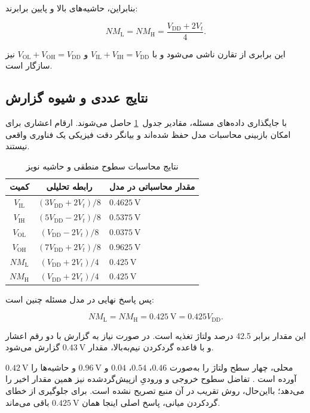 بنابراین، حاشیه‌های بالا و پایین برابرند:

\nopagebreak[3]
\begin{equation}\label{eq:ex17-11}
\boxed{
NM_{\mathrm{L}}=NM_{\mathrm{H}}
=\frac{V_{\mathrm{DD}}+2V_t}{4}
}.
\end{equation}

این برابری از تقارن  ناشی می‌شود و با \(V_{\mathrm{IL}}+V_{\mathrm{IH}}=V_{\mathrm{DD}}\) و \(V_{\mathrm{OL}}+V_{\mathrm{OH}}=V_{\mathrm{DD}}\) نیز سازگار است.

\clearpage
\subsection*{نتایج عددی و شیوه گزارش}

با جایگذاری داده‌های مسئله، مقادیر جدول~\ref{tab:noise} حاصل می‌شوند. ارقام اعشاری برای امکان بازبینی محاسبات مدل حفظ شده‌اند و بیانگر دقت فیزیکی یک فناوری واقعی نیستند.

\begin{table}[htbp]\centering
\caption{نتایج محاسبات سطوح منطقی و حاشیه نویز}
\label{tab:noise}
\begin{tabularx}{\linewidth}{ccX}\toprule
کمیت & رابطه تحلیلی & مقدار محاسباتی در مدل\\
\midrule
\(V_{\mathrm{IL}}\) & \((3V_{\mathrm{DD}}+2V_t)/8\) & \(\qty{0.4625}{\volt}\)\\
\(V_{\mathrm{IH}}\) & \((5V_{\mathrm{DD}}-2V_t)/8\) & \(\qty{0.5375}{\volt}\)\\
\(V_{\mathrm{OL}}\) & \((V_{\mathrm{DD}}-2V_t)/8\) & \(\qty{0.0375}{\volt}\)\\
\(V_{\mathrm{OH}}\) & \((7V_{\mathrm{DD}}+2V_t)/8\) & \(\qty{0.9625}{\volt}\)\\
\(NM_{\mathrm{L}}\) & \((V_{\mathrm{DD}}+2V_t)/4\) & \(\qty{0.425}{\volt}\)\\
\(NM_{\mathrm{H}}\) & \((V_{\mathrm{DD}}+2V_t)/4\) & \(\qty{0.425}{\volt}\)\\
\bottomrule\end{tabularx}\end{table}

پس پاسخ نهایی در مدل مسئله چنین است:

\nopagebreak[3]
\begin{equation}\label{eq:ex17-12}
\boxed{NM_{\mathrm{L}}=NM_{\mathrm{H}}=\qty{0.425}{\volt}
=0.425V_{\mathrm{DD}}}.
\end{equation}

این مقدار برابر \num{42.5} درصد ولتاژ تغذیه است. در صورت نیاز به گزارش با دو رقم اعشار و با قاعده گردکردن نیم‌به‌بالا، مقدار \(\qty{0.43}{\volt}\) گزارش می‌شود.

 محلی، چهار سطح ولتاژ را به‌صورت \(0.46\)، \(0.54\)، \(0.04\) و \(\qty{0.96}{\volt}\) و حاشیه‌ها را \(\qty{0.42}{\volt}\) آورده است \cite{manual}. تفاضل سطوح خروجی و ورودیِ ازپیش‌گردشده نیز همین مقدار اخیر را می‌دهد؛ بااین‌حال، روش تقریب در آن منبع تصریح نشده است. برای جلوگیری از خطای گردکردن میانی، پاسخ اصلی اینجا همان \(\qty{0.425}{\volt}\) باقی می‌ماند.

